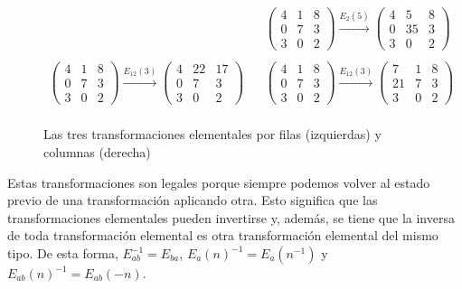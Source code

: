 \begin{figure}[h!]
\[\begin{array}{ccc}
		&&

		\begin{pmatrix}
			4 & 1 & 8 \\
			0 & 7 & 3 \\
			3 & 0 & 2
		\end{pmatrix}
		\xrightarrow{E_{2}(5)}
		\begin{pmatrix}
			4 & 5  & 8 \\
			0 & 35 & 3 \\
			3 & 0  & 2
		\end{pmatrix}

		\\&&\\

		\begin{pmatrix}
			4 & 1 & 8 \\
			0 & 7 & 3 \\
			3 & 0 & 2
		\end{pmatrix}
		\xrightarrow{E_{12}(3)}
		\begin{pmatrix}
			4 & 22 & 17 \\
			0 & 7  & 3  \\
			3 & 0  & 2
		\end{pmatrix}

		&&

		\begin{pmatrix}
			4 & 1 & 8 \\
			0 & 7 & 3 \\
			3 & 0 & 2
		\end{pmatrix}
		\xrightarrow{E_{12}(3)}
		\begin{pmatrix}
			7  & 1 & 8 \\
			21 & 7 & 3 \\
			3  & 0 & 2
		\end{pmatrix}

		\\
	\end{array}
\]
\caption{Las tres transformaciones elementales por filas (izquierdas) y columnas (derecha)}
\end{figure}

Estas transformaciones son legales porque siempre podemos volver al estado previo de una transformación aplicando otra.
Esto significa que las transformaciones elementales pueden invertirse y, además, se tiene que la inversa de toda transformación elemental es otra transformación elemental del mismo tipo.
De esta forma, $E_{ab}^{-1} = E_{ba}$, ${E_a(n)}^{-1} = E_a(n^{-1})$ y ${E_{ab}(n)}^{-1} = E_{ab}(-n)$.

